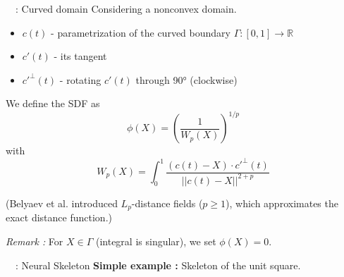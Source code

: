\begin{frame}{\appendixname~\theappendixframenumber~: Curved domain \cite{sukumar_exact_2022}}
	Considering a nonconvex domain.
	\begin{itemize}[]
		\item $c(t)$ - parametrization of the curved boundary $\Gamma:[0,1]\rightarrow\mathbb{R}$
		\item $c'(t)$ - its tangent
		\item $c'^\perp(t)$ - rotating $c'(t)$ through 90° (clockwise)
	\end{itemize}
	\vspace{10pt}
	\begin{minipage}{0.68\linewidth}
		We define the SDF as 
		\begin{equation*}
			\phi(X)=\left(\frac{1}{W_p(X)}\right)^{1/p}
		\end{equation*}
		with
		\begin{equation*}
			W_p(X)=\int_0^1\frac{(c(t)-X)\cdot c'^\perp(t)}{||c(t)-X||^{2+p}}
		\end{equation*}
	\end{minipage}
	\begin{minipage}{0.28\linewidth}
		\centering
	\end{minipage}
	\footnotesize
	
	\vspace{5pt}
	(Belyaev et al. \cite{belyaev_signed_2013} introduced $L_p$-distance ﬁelds ($p\ge 1$), which approximates the exact distance function.)
	
	\vspace{15pt}
	\textit{Remark :} For $X\in\Gamma$ (integral is singular), we set $\phi(X)=0$.
\end{frame}
\addtocounter{appendixframenumber}{1}

\begin{frame}{\appendixname~\theappendixframenumber~: Neural Skeleton}
	\textbf{Simple example :} Skeleton of the unit square.
	
	\begin{minipage}{\linewidth}
		\centering
	\end{minipage}
\end{frame}
\addtocounter{appendixframenumber}{1}
